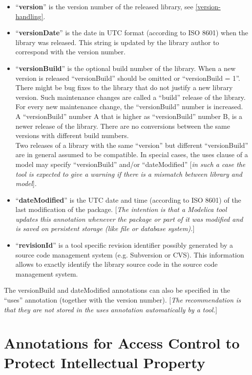 \documentclass[10pt,a4paper]{report}
\def\doublelabel#1{\label{#1}\hypertarget{#1}{}}
\begin{document}
\begin{itemize}
\item
  ``\textbf{version}'' is the version number of the released library,
  see \ref{version-handling}.
\item
  ``\textbf{versionDate}'' is the date in UTC format (according to ISO
  8601) when the library was released. This string is updated by the
  library author to correspond with the version number.
\item
  ``\textbf{versionBuild}'' is the optional build number of the library.
  When a new version is released ``versionBuild'' should be omitted or
  ``versionBuild = 1''. There might be bug fixes to the library that do
  not justify a new library version. Such maintenance changes are called
  a ``build'' release of the library. For every new maintenance change,
  the ``versionBuild'' number is increased. A ``versionBuild'' number A
  that is higher as ``versionBuild'' number B, is a newer release of the
  library. There are no conversions between the same versions with
  different build numbers. \emph{\\
  }Two releases of a library with the same ``version'' but different
  ``versionBuild'' are in general assumed to be compatible. In special
  cases, the uses clause of a model may specify ``versionBuild'' and/or
  ``dateModified'' {[}\emph{in such a case the tool is expected to give
  a warning if there is a mismatch between library and model}{]}\emph{.}
\item
  ``\textbf{dateModified}'' is the UTC date and time (according to ISO
  8601) of the last modification of the package. {[}\emph{The intention
  is that a Modelica tool updates this annotation whenever the package
  or part of it was modified and is saved on persistent storage (like
  file or database system).}{]}
\item
  ``\textbf{revisionId}'' is a tool specific revision identifier
  possibly generated by a source code management system (e.g. Subversion
  or CVS). This information allows to exactly identify the library
  source code in the source code management system.
\end{itemize}

The versionBuild and dateModified annotations can also be specified in
the ``uses'' annotation (together with the version number). {[}\emph{The
recommendation is that they are not stored in the uses annotation
automatically by a tool.}{]}

\section{Annotations for Access Control to Protect Intellectual Property}\doublelabel{annotations-for-access-control-to-protect-intellectual-property}
\end{document}
